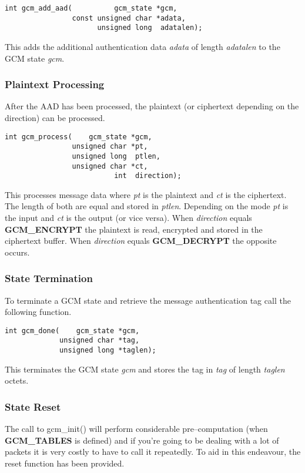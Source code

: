 \documentclass[synpaper]{book}
\begin{document}
\begin{verbatim}
int gcm_add_aad(          gcm_state *gcm,
                const unsigned char *adata,
                      unsigned long  adatalen);
\end{verbatim}
This adds the additional authentication data \textit{adata} of length \textit{adatalen} to the GCM state \textit{gcm}.

\subsubsection{Plaintext Processing}
After the AAD has been processed, the plaintext (or ciphertext depending on the direction) can be processed.

\begin{verbatim}
int gcm_process(    gcm_state *gcm,
                unsigned char *pt,
                unsigned long  ptlen,
                unsigned char *ct,
                          int  direction);
\end{verbatim}
This processes message data where \textit{pt} is the plaintext and \textit{ct} is the ciphertext.  The length of both are equal and stored in \textit{ptlen}.  Depending on
the mode \textit{pt} is the input and \textit{ct} is the output (or vice versa).  When \textit{direction} equals \textbf{GCM\_ENCRYPT} the plaintext is read,
encrypted and stored in the ciphertext buffer.  When \textit{direction} equals \textbf{GCM\_DECRYPT} the opposite occurs.

\subsubsection{State Termination}
To terminate a GCM state and retrieve the message authentication tag call the following function.

\begin{verbatim}
int gcm_done(    gcm_state *gcm,
             unsigned char *tag,
             unsigned long *taglen);
\end{verbatim}
This terminates the GCM state \textit{gcm} and stores the tag in \textit{tag} of length \textit{taglen} octets.

\subsubsection{State Reset}
The call to gcm\_init() will perform considerable pre--computation (when \textbf{GCM\_TABLES} is defined) and if you're going to be dealing with a lot of packets
it is very costly to have to call it repeatedly.  To aid in this endeavour, the reset function has been provided.
\end{document}
